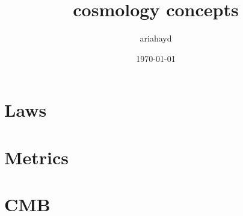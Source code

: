 \documentclass{paper}
\title{cosmology concepts}
\author{ariahayd}
\date{\today}
\begin{document}
 

\maketitle

\section{Laws}

\section{Metrics} 

\section{CMB}

\pagebreak


\end{document}
